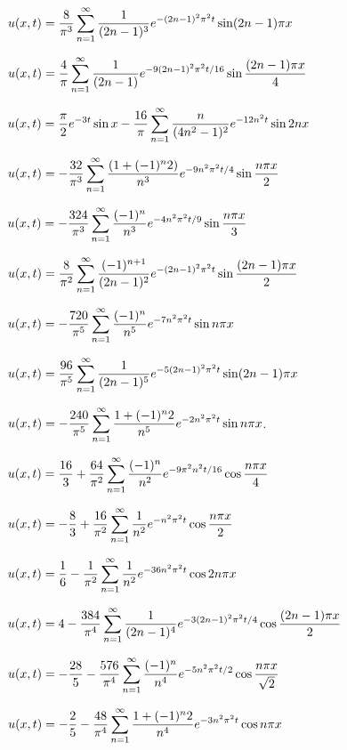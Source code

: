 \medskip

$u(x,t)=\displaystyle\frac{8}{\pi^{3}}\sum_{n=1}^{\infty}
\frac{1}{(2n-1)^{3}}
e^{-(2n-1)^{2}\pi^{2}t}\sin(2n-1)\pi x$

$u(x,t)=\displaystyle\frac{4}{\pi}\sum_{n=1}^{\infty}\frac{1}{(2n-1)}
e^{-9(2n-1)^{2}\pi^{2}t/16}\sin\frac{(2n-1)\pi x}{4}$

$u(x,t)=\displaystyle\frac{\pi}{2}e^{-3t}\sin
x-\frac{16}{\pi}\sum_{n=1}^{\infty}\frac{n}{(4n^{2}-1)^{2}}e^{-12n^{2}t}\sin2nx$

$u(x,t)=\displaystyle-\frac{32}{\pi^{3}}\sum_{n=1}^{\infty}
\frac{(1+(-1)^{n}2)}{n^{3}}
e^{-9n^{2}\pi^{2}t/4}\sin\frac{n\pi x}{2}$

$u(x,t)=\displaystyle-\frac{324}{\pi^{3}}\sum_{n=1}^{\infty}\frac{(-1)^{n}}{n^{3}}
e^{-4n^{2}\pi^{2}t/9}\sin\frac{n\pi x}{3}$

$u(x,t)=\displaystyle\frac{8}{\pi^{2}}\sum_{n=1}^{\infty}\frac{(-1)^{n+1}}{(2n-1)^{2}}
e^{-(2n-1)^{2}\pi^{2}t}\sin\frac{(2n-1)\pi x}{2}$

$u(x,t)=\displaystyle-\frac{720}{\pi^{5}}\sum_{n=1}^{\infty}\frac{(-1)^{n}}{n^{5}}e^{-7n^{2}\pi^{2}t}\sin n\pi x$

$u(x,t)=\displaystyle\frac{96}{\pi^{5}}\sum_{n=1}^{\infty}\frac{1}{(2n-1)^{5}}
e^{-5(2n-1)^{2}\pi^{2}t}\sin(2n-1)\pi x$

$u(x,t)=\displaystyle-\frac{240}{\pi^{5}}\sum_{n=1}^{\infty}\frac{1+(-1)^{n}2}{n^{5}}e^{-2n^{2}\pi^{2}t}\sin n\pi x$.

$u(x,t)=\displaystyle\frac{16}{3}+\frac{64}{\pi^{2}}\sum_{n=1}^{\infty}\frac{(-1)^{n}}{n^{2}}e^{-9\pi^{2}n^{2}t/16}\cos\frac{n\pi x}{4}$

$u(x,t)=\displaystyle-\frac{8}{3}+\frac{16}{\pi^{2}}\sum_{n=1}^{\infty}\frac{1}{n^{2}}e^{-n^{2}\pi^{2}t}\cos\frac{n\pi x}{2}$

$u(x,t)=\displaystyle\frac{1}{6}-\frac{1}{\pi^{2}}\sum_{n=1}^{\infty}\frac{1}{n^{2}}e^{-36n^{2}\pi^{2}t}\cos2n\pi x$

$u(x,t)=\displaystyle4-\frac{384}{\pi^{4}}\sum_{n=1}^{\infty}\frac{1}{(2n-1)^{4}}e^{-3(2n-1)^{2}\pi^{2}t/4}\cos\frac{(2n-1)\pi x}{2}$

$u(x,t)=\displaystyle-\frac{28}{5}-\frac{576}{\pi^{4}}\sum_{n=1}^{\infty}\frac{(-1)^{n}}{n^{4}}e^{-5n^{2}\pi^{2}t/2}\cos\frac{n\pi x}{\sqrt{2}}$

$u(x,t)=\displaystyle-\frac{2}{5}-\frac{48}{\pi^{4}}\sum_{n=1}^{\infty}\frac{1+(-1)^{n}2}{n^{4}}e^{-3n^{2}\pi^{2}t}\cos n\pi x$

